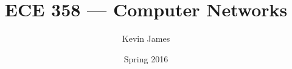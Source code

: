 \documentclass[12pt]{article}
\begin{document}
\title{ECE 358 --- Computer Networks}
\author{Kevin James}
\date{\vspace{-2ex}Spring 2016}
\maketitle\HRule

\tableofcontents
\newpage

\section{}
\end{document}
